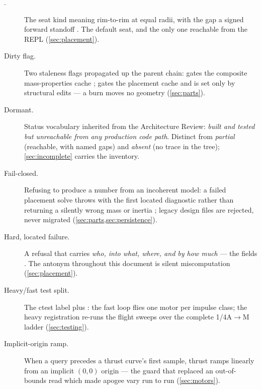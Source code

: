 \begin{description}

\item[.] The seat kind meaning rim-to-rim at equal radii, with the gap a signed
  forward standoff . The default seat, and the only one
  reachable from the REPL (\cref{sec:placement}).

\item[Dirty flag.] Two staleness flags propagated up the parent chain:
   gates the composite mass-properties cache
  ;  gates the placement cache
   and is set only by structural edits --- a burn moves no
  geometry (\cref{sec:parts}).

\item[Dormant.] Status vocabulary inherited from the Architecture Review: \emph{built and
  tested but unreachable from any production code path}. Distinct from \emph{partial}
  (reachable, with named gaps) and \emph{absent} (no trace in the tree);
  \cref{sec:incomplete} carries the inventory.

\item[Fail-closed.] Refusing to produce a number from an incoherent model: a failed
  placement solve throws with the first located diagnostic rather than returning a silently
  wrong mass or inertia ; legacy design files are rejected,
  never migrated (\cref{sec:parts,sec:persistence}).

\item[Hard, located failure.] A refusal that carries \emph{who, into what, where, and by
  how much} --- the  fields .
  The antonym throughout this document is silent miscomputation (\cref{sec:placement}).

\item[Heavy/fast test split.] The ctest label  plus
   : the fast loop flies one
  motor per impulse class; the heavy registration re-runs the flight sweeps over the
  complete 1/4A$\to$M ladder (\cref{sec:testing}).

\item[Implicit-origin ramp.] When a query precedes a thrust curve's first sample, thrust
  ramps linearly from an implicit $(0,0)$ origin  --- the
  guard that replaced an out-of-bounds read which made apogee vary run to run
  (\cref{sec:motors}).


\end{description}
